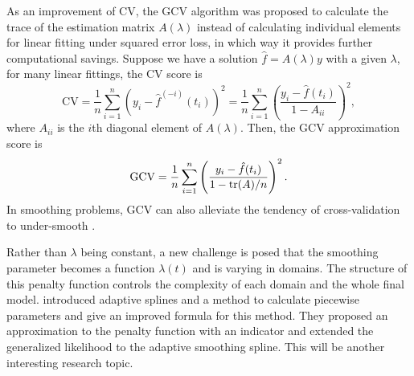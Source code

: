 As an improvement of CV, the GCV algorithm was proposed to calculate the trace of the estimation matrix $A(\lambda)$ instead of calculating individual elements for linear fitting under squared error loss, in which way it provides further computational savings. Suppose we have a solution $\hat{f}=A(\lambda)y$ with a given $\lambda$, for many linear fittings, the CV score is 
\begin{equation*}
\mbox{CV} = \frac{1}{n}\sum_{i=1}^{n} \left( y_i - \hat{f}^{(-i)}(t_i)\right)^2 = \frac{1}{n} \sum_{i=1}^{n}\left( \frac{y_i-\hat{f}(t_i)}{1-A_{ii}}  \right)^2, 
\end{equation*}
where $A_{ii}$ is the $i$th diagonal element of $A(\lambda)$. Then, the GCV approximation score is 
\begin{equation*}
\mbox{GCV} =\frac{1}{n} \sum_{i=1}^{n}\left( \frac{y_i-\hat{f}(t_i)}{1-\mathrm{tr}(A)/n}  \right)^2.
\end{equation*}
In smoothing problems, GCV can also alleviate the tendency of cross-validation to under-smooth \cite{esl2009}. 


Rather than $\lambda$ being constant, a new challenge is posed that the smoothing parameter becomes a function $\lambda(t)$ and is varying in domains. The structure of this penalty function controls the complexity of each domain and the whole final model.  \cite{donoho1995wavelet} introduced adaptive splines and a method to calculate piecewise parameters and \cite{liu2010data} give an improved formula for this method. They proposed an approximation to the penalty function with an indicator and extended the generalized likelihood to the adaptive smoothing spline. This will be another interesting research topic. 






